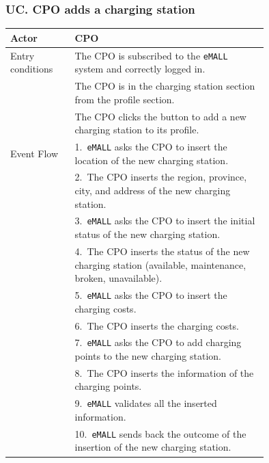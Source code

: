 \subsubsection*{UC\cuc . CPO adds a charging station}
\begin{center}
    \begin{longtable}{lp{0.75\linewidth}}
        \hline
        Actor            & CPO                                                                                                       \\
        \hline
        Entry conditions & The CPO is subscribed to the \verb|eMALL| system and correctly logged in.                                 \\
        & The CPO is in the charging station section from the profile section.                                      \\
        & The CPO clicks the button to add a new charging station to its profile.                                   \\
        \hline
        Event Flow       & 1.\ \verb|eMALL| asks the CPO to insert the location of the new charging station.                         \\
        & 2.\ The CPO inserts the region, province, city, and address of the new charging station.                  \\
        & 3.\ \verb|eMALL| asks the CPO to insert the initial status of the new charging station.                   \\
        & 4.\ The CPO inserts the status of the new charging station (available, maintenance, broken, unavailable). \\
        & 5.\ \verb|eMALL| asks the CPO to insert the charging costs.                                               \\
        & 6.\ The CPO inserts the charging costs.                                                                   \\
        & 7.\ \verb|eMALL| asks the CPO to add charging points to the new charging station.                         \\
        & 8.\ The CPO inserts the information of the charging points.                                               \\
        & 9.\ \verb|eMALL| validates all the inserted information.                                                  \\
        & 10.\ \verb|eMALL| sends back the outcome of the insertion of the new charging station.                    \\

\end{longtable}
\end{center}
